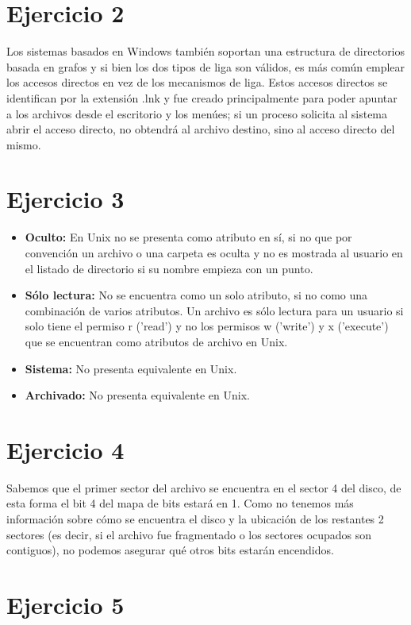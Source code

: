 \documentclass[11pt]{article}
\begin{document}
\section*{Ejercicio 2}

Los sistemas basados en Windows también soportan una estructura de directorios
basada en grafos y si bien los dos tipos de liga son válidos, es más común emplear los
accesos directos en vez de los mecanismos de liga. Estos accesos directos se
identifican por la extensión .lnk y fue creado principalmente para poder apuntar
a los archivos desde el escritorio y los menúes; si un proceso solicita al
sistema abrir el acceso directo, no obtendrá al archivo destino, sino al
acceso directo del mismo.

\section*{Ejercicio 3}

\begin{itemize}
\item \textbf{Oculto:} En Unix no se presenta como atributo en sí, si no que
      por convención un archivo o una carpeta es oculta y no es mostrada al usuario
      en el listado de directorio si su nombre empieza con un punto.
\item \textbf{Sólo lectura:} No se encuentra como un solo atributo, si no como una
      combinación de varios atributos. Un archivo es sólo lectura para un usuario si solo
      tiene el permiso r ('read') y no los permisos w ('write') y x ('execute')
      que se encuentran como atributos de archivo en Unix.
\item \textbf{Sistema:} No presenta equivalente en Unix.
\item \textbf{Archivado:} No presenta equivalente en Unix.
\end{itemize}

\section*{Ejercicio 4}

Sabemos que el primer sector del archivo se encuentra en el sector 4 del disco,
de esta forma el bit 4 del mapa de bits estará en 1. Como no tenemos más información
sobre cómo se encuentra el disco y la ubicación de los restantes 2 sectores (es decir,
si el archivo fue fragmentado o los sectores ocupados son contiguos), no
podemos asegurar qué otros bits estarán encendidos.

\section*{Ejercicio 5}
\end{document}
